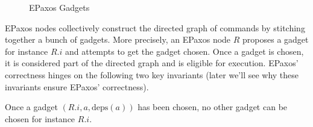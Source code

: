 \documentclass{mwhittaker}
\theoremstyle{definition}
\newcommand{\deps}[1]{\text{deps}(#1)}
\newcommand{\invlabel}[1]{\label{invariant:#1}}
\begin{document}
\begin{figure}[h]
  \centering

  \begin{subfigure}[b]{0.19\textwidth}
  \end{subfigure}
  \begin{subfigure}[b]{0.49\textwidth}
  \end{subfigure}
  \begin{subfigure}[b]{0.29\textwidth}
  \end{subfigure}

  \caption{EPaxos Gadgets}
\end{figure}

EPaxos nodes collectively construct the directed graph of commands by stitching
together a bunch of gadgets. More precisely, an EPaxos node $R$ proposes a
gadget for instance $R.i$ and attempts to get the gadget chosen. Once a gadget
is chosen, it is considered part of the directed graph and is eligible for
execution. EPaxos' correctness hinges on the following two key invariants
(later we'll see why these invariants ensure EPaxos' correctness).

\begin{boxedinvariant}\invlabel{GadgetsChosen}
  Once a gadget $(R.i, a, \deps{a})$ has been chosen, no other gadget can be
  chosen for instance $R.i$.
\end{boxedinvariant}
\end{document}
